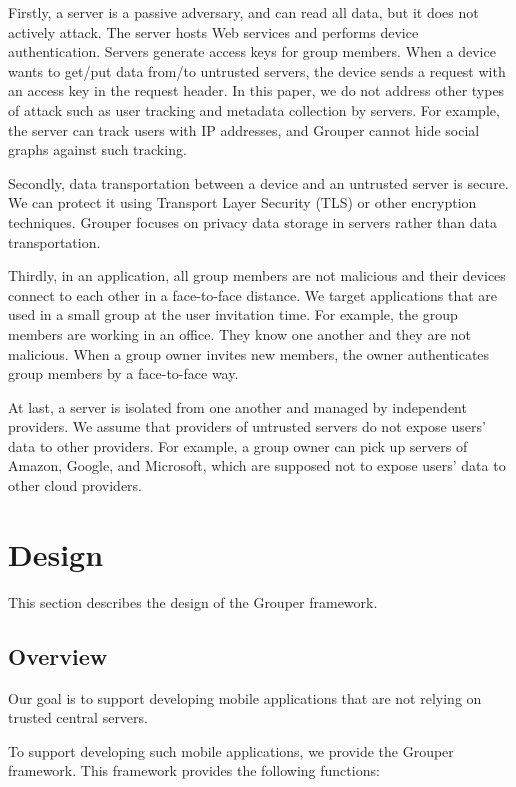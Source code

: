 \documentclass[twocolumn,10pt]{article}
\begin{document}
Firstly, a server is a passive adversary, and can read all data, but it does not actively attack.
The server hosts Web services and performs device authentication.
Servers generate access keys for group members. 
When a device wants to get/put data from/to untrusted servers, the device sends a request with an access key in the request header.
In this paper, we do not address other types of attack such as user tracking and metadata collection by servers. 
For example, the server can track users with IP addresses, and Grouper cannot hide social graphs against such tracking.

Secondly, data transportation between a device and an untrusted server is secure.
We can protect it using Transport Layer Security (TLS) or other encryption techniques.
Grouper focuses on privacy data storage in servers rather than data transportation.

Thirdly, in an application, all group members are not malicious and their devices connect to each other in a face-to-face distance.
We target applications that are used in a small group at the user invitation time.
For example, the group members are working in an office.
They know one another and they are not malicious.
When a group owner invites new members, the owner authenticates group members by a face-to-face way.

At last, a server is isolated from one another and managed by independent providers.
We assume that providers of untrusted servers do not expose users' data to other providers.
For example, a group owner can pick up servers of Amazon, Google, and Microsoft, which are supposed not to expose users' data to other cloud providers.

\section{Design}

This section describes the design of the Grouper framework.

\subsection{Overview}

Our goal is to support developing mobile applications that are not relying on trusted central servers.


To support developing such mobile applications, we provide the Grouper framework.
This framework provides the following functions:
\end{document}
